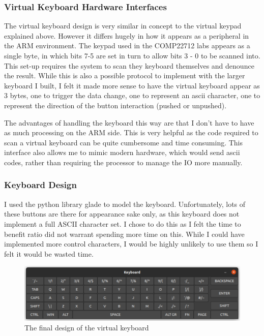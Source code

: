 \subsubsection{Virtual Keyboard Hardware Interfaces}
The virtual keyboard design is very similar in concept to the virtual keypad explained above. However it differs hugely in how it appears as a peripheral in the ARM environment. The keypad used in the COMP22712 labs appears as a single byte, in which bits 7-5 are set in turn to allow bits 3 - 0 to be scanned into. This set-up requires the system to scan they keyboard themselves and denounce the result. While this is also a possible protocol to implement with the larger keyboard I built, I felt it made more sense to have the virtual keyboard appear as 3 bytes, one to trigger the data change, one to represent an ascii character, one to represent the direction of the button interaction (pushed or unpushed).

The advantages of handling the keyboard this way are that I don't have to have as much processing on the ARM side. This is very helpful as the code required to scan a virtual keyboard can be quite cumbersome and time consuming. This interface also allows me to mimic modern hardware, which would send ascii codes, rather than requiring the processor to manage the IO more manually. 
\subsubsection{Keyboard Design}
I used the python library glade to model the keyboard. Unfortunately, lots of these buttons are there for appearance sake only, as this keyboard does not implement a full ASCII character set. I chose to do this as I felt the time to benefit ratio did not warrant spending more time on this. While I could have implemented more control characters, I would be highly unlikely to use them so I felt it would be wasted time. 

\begin{figure}[h!]
	\includegraphics[width=\linewidth]{figures/keyboard.png}
	\caption{The final design of the virtual keyboard}
	\label{fig:keyboard}
\end{figure} 
 
